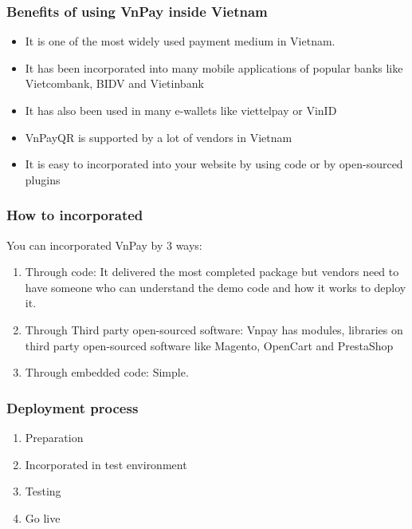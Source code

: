 \documentclass[12pt,a4paper]{article}
\begin{document}
	\subsubsection{Benefits of using VnPay inside Vietnam}
	\begin{itemize}
		\item It is one of the most widely used payment medium in Vietnam.
		\item It has been incorporated into many mobile applications of popular banks like Vietcombank, BIDV and Vietinbank
		\item It has also been used in many e-wallets like viettelpay or VinID
		\item VnPayQR is supported by a lot of vendors in Vietnam
		\item It is easy to incorporated into your website by using code or by open-sourced plugins 
	\end{itemize}
	\subsubsection{How to incorporated}
	You can incorporated VnPay by 3 ways:
	\begin{enumerate}
		\item Through code: It delivered the most completed package but vendors need to have someone who can understand the demo code and how it works to deploy it.
		\item Through Third party open-sourced software: Vnpay has modules, libraries on third party open-sourced software like Magento, OpenCart and PrestaShop
		\item Through embedded code: Simple.
	\end{enumerate}
	\subsubsection{Deployment process}
	\begin{enumerate}
		\item Preparation
		\item Incorporated in test environment
		\item Testing
		\item Go live
	\end{enumerate}
\end{document}
